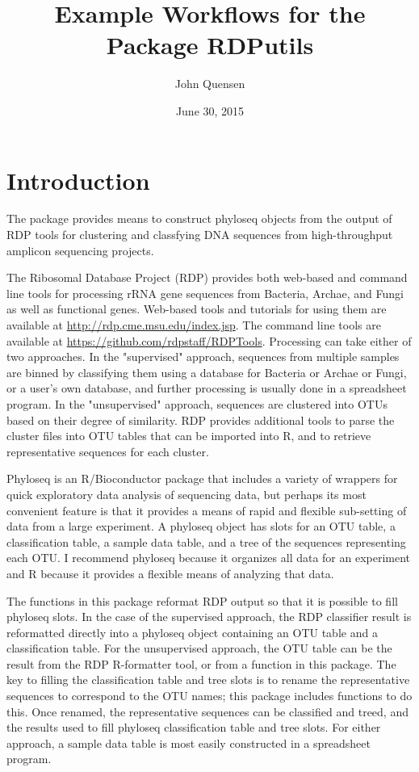 \documentclass{article}
\title{Example Workflows for the Package RDPutils}
\author{John Quensen}
\date{June 30, 2015}
\begin{document}


\maketitle

\section*{Introduction}
The package provides means to construct phyloseq objects from the output of RDP tools for clustering and classfying DNA sequences from high-throughput amplicon sequencing projects. 

The Ribosomal Database Project (RDP) provides both web-based and command line tools for processing rRNA gene sequences from Bacteria, Archae, and Fungi as well as functional genes.  Web-based tools and tutorials for using them are available at \href{http://rdp.cme.msu.edu/index.jsp}{http://rdp.cme.msu.edu/index.jsp}.  The command line tools are available at \href{https://github.com/rdpstaff/RDPTools}{https://github.com/rdpstaff/RDPTools}. Processing can take either of two approaches.  In the "supervised" approach, sequences from multiple samples are binned by classifying them using a database for Bacteria or Archae or Fungi, or a user's own database, and further processing is usually done in a spreadsheet program.  In the "unsupervised" approach, sequences are clustered into OTUs based on their degree of similarity.   RDP provides additional tools to parse the cluster files into OTU tables that can be imported into R, and to retrieve representative sequences for each cluster.  

Phyloseq is an R/Bioconductor package that includes a variety of wrappers for quick exploratory data analysis of sequencing data, but perhaps its most convenient feature is that it provides a means of rapid and flexible sub-setting of data from a large experiment.  A phyloseq object has slots for an OTU table, a classification table, a sample data table, and a tree of the sequences representing each OTU.  I recommend phyloseq because it organizes all data for an experiment and R because it provides a flexible means of analyzing that data.

The functions in this package reformat RDP output so that it is possible to fill phyloseq slots.  In the case of the supervised approach, the RDP classifier result is reformatted directly into a phyloseq object containing an OTU table and a classification table.  For the unsupervised approach, the OTU table can be the result from the RDP R-formatter tool, or from a function in this package. The key to filling the classification table and tree slots is to rename the representative sequences to correspond to the OTU names; this package includes functions to do this.  Once renamed, the representative sequences can be classified and treed, and the results used to fill phyloseq classification table and tree slots.  For either approach, a sample data table is most easily constructed in a spreadsheet program.
\end{document}
